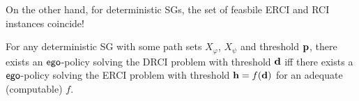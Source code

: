 

On the other hand, for deterministic SGs, the set of feasbile ERCI and
RCI instances coincide!
\begin{theorem}
  For any deterministic SG with some path sets $X_\varphi$, $X_\psi$
  and threshold $\mathbf{p}$, there exists an $\mathsf{ego}$-policy solving
  the DRCI problem with threshold $\mathbf{d}$ iff there exists a
  $\mathsf{ego}$-policy solving the ERCI problem with threshold
  $\mathbf{h} = f(\mathbf{d})$ for an adequate (computable) $f$.
\end{theorem}

